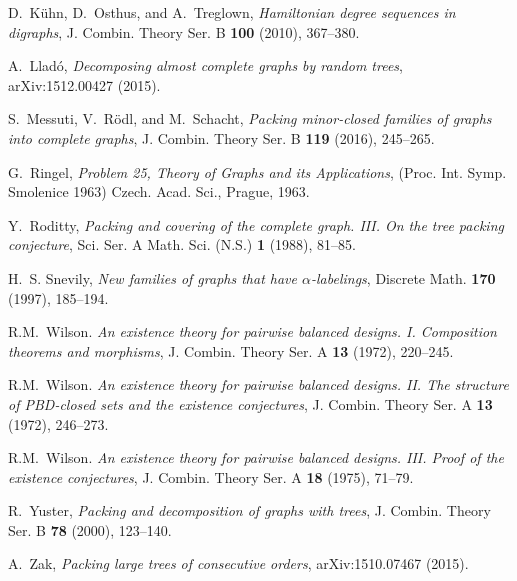 \documentclass[a4paper, 11pt, reqno]{amsart}
\numberwithin{equation}{section}
\newcommand{\1}{{\rm 1\hspace*{-0.4ex}%
\rule{0.1ex}{1.52ex}\hspace*{0.2ex}}}
\begin{document}
\begin{thebibliography}{10}
D.~K{\"u}hn, D.~Osthus, and A.~Treglown, \emph{Hamiltonian degree sequences in
  digraphs}, J. Combin. Theory Ser. B \textbf{100} (2010), 367--380.

A.~Llad\'o, \emph{Decomposing almost complete graphs by random trees},
  arXiv:1512.00427 (2015).

S.~Messuti, V.~R{\"o}dl, and M.~Schacht, \emph{Packing minor-closed families of
  graphs into complete graphs}, J. Combin. Theory Ser. B \textbf{119} (2016),
  245--265.

G.~Ringel, \emph{Problem 25, {T}heory of {G}raphs and its {A}pplications},
  (Proc. Int. Symp. Smolenice 1963) Czech. Acad. Sci., Prague, 1963.

Y.~Roditty, \emph{Packing and covering of the complete graph. {III}. {O}n the
  tree packing conjecture}, Sci. Ser. A Math. Sci. (N.S.) \textbf{1} (1988),
  81--85.

H.~S. Snevily, \emph{New families of graphs that have {$\alpha$}-labelings},
  Discrete Math. \textbf{170} (1997), 185--194.

R.M.~Wilson.
\newblock \emph{An existence theory for pairwise balanced designs. I. {C}omposition
  theorems and morphisms},
J. Combin. Theory Ser. A \textbf{13} (1972), 220--245.

R.M.~Wilson.
\newblock \emph{An existence theory for pairwise balanced designs. II. {T}he
  structure of {PBD}-closed sets and the existence conjectures},
J. Combin. Theory Ser. A  \textbf{13} (1972), 246--273.

R.M.~Wilson.
\newblock \emph{An existence theory for pairwise balanced designs. III. {P}roof of
  the existence conjectures},
J. Combin. Theory Ser. A \textbf{18} (1975), 71--79.


R.~Yuster, \emph{Packing and decomposition of graphs with trees}, J. Combin.
  Theory Ser. B \textbf{78} (2000), 123--140.

A.~Zak, \emph{Packing large trees of consecutive orders}, arXiv:1510.07467
  (2015).

\end{thebibliography}
\end{document}
